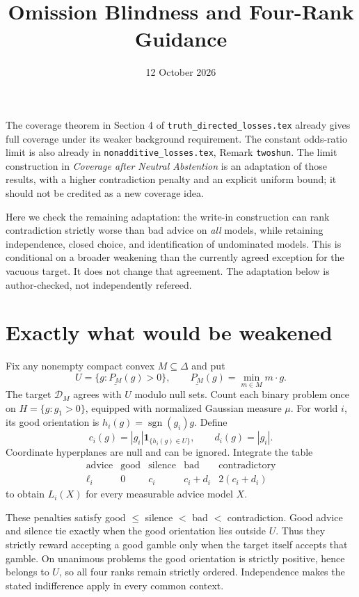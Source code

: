 \documentclass[11pt]{article}
\title{Omission Blindness and Four-Rank Guidance}
\author{}\date{12 October 2026}
\newcommand{\Dscr}{\mathcal D}
\begin{document}
\maketitle

\noindent
The coverage theorem in Section 4 of \texttt{truth\_directed\_losses.tex}
already gives full coverage under its weaker background
requirement. The constant odds-ratio limit is also already in
\texttt{nonadditive\_losses.tex}, Remark \texttt{twoshun}.
The limit construction in \emph{Coverage after Neutral Abstention} is an
adaptation of those results, with a higher contradiction penalty and an
explicit uniform bound; it should not be credited as a new coverage idea.

Here we check the remaining adaptation: the write-in construction can
rank contradiction strictly worse than bad advice on \emph{all} models,
while retaining independence, closed choice, and identification of
undominated models. This is conditional on a broader weakening than the
currently agreed exception for the vacuous target. It does not change
that agreement. The adaptation below is author-checked, not independently
refereed.

\section{Exactly what would be weakened}

Fix any nonempty compact convex $M\subseteq\Delta$ and put
\[
 U=\{g:\underline{P_M}(g)>0\},\qquad
 \underline{P_M}(g)=\min_{m\in M}m\cdot g.
\]
The target $\Dscr_M$ agrees with $U$ modulo null sets. Count each binary
problem once on $H=\{g:g_1>0\}$, equipped with normalized Gaussian
measure $\mu$. For world $i$, its good orientation is
$h_i(g)=\operatorname{sgn}(g_i)g$. Define
\[
 c_i(g)=|g_i|\mathbf1_{\{h_i(g)\in U\}},\qquad d_i(g)=|g_i|.
\]
Coordinate hyperplanes are null and can be ignored. Integrate the table
\[
\begin{array}{c|cccc}
 \text{advice}&\text{good}&\text{silence}&\text{bad}&\text{contradictory}\\\hline
 \ell_i&0&c_i&c_i+d_i&2(c_i+d_i)
\end{array}
\tag{1}
\]
to obtain $L_i(X)$ for every measurable advice model $X$.

These penalties satisfy good $\le$ silence $<$ bad $<$ contradiction.
Good advice and silence tie exactly when the good orientation lies
outside $U$. Thus they strictly reward accepting a good gamble only when
the target itself accepts that gamble. On unanimous problems the good
orientation is strictly positive, hence belongs to $U$, so all four
ranks remain strictly ordered. Independence makes the stated indifference
apply in every common context.
\end{document}
